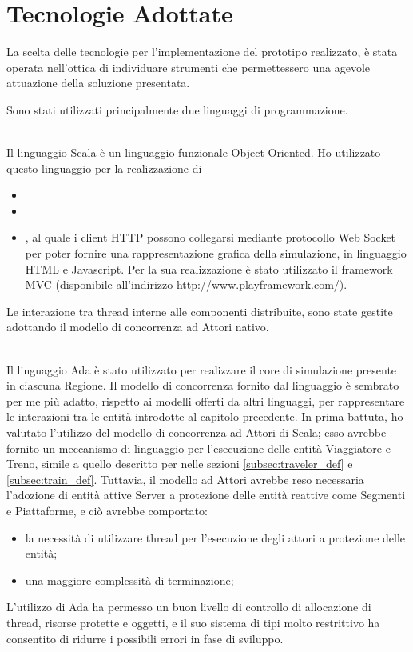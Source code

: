 \chapter{Tecnologie Adottate}

La scelta delle tecnologie per l'implementazione del prototipo realizzato, è stata operata nell'ottica di individuare strumenti che permettessero una agevole attuazione della soluzione presentata.

Sono stati utilizzati principalmente due linguaggi di programmazione.
	\begin{description}
		\item {} \\
		Il linguaggio Scala è un linguaggio funzionale Object Oriented. Ho utilizzato questo linguaggio per la realizzazione di 
			\begin{itemize}
				\item {}
				\item {}
				\item {}, al quale i client HTTP possono collegarsi mediante protocollo Web Socket per poter fornire una rappresentazione grafica della simulazione, in linguaggio HTML e Javascript. Per la sua realizzazione è stato utilizzato il framework MVC  (disponibile all'indirizzo \url{http://www.playframework.com/}).
			\end{itemize}
		Le interazione tra thread interne alle componenti distribuite, sono state gestite adottando il modello di concorrenza ad Attori nativo. 
		\item {} \\
		Il linguaggio Ada è stato utilizzato per realizzare il core di simulazione presente in ciascuna Regione. Il modello di concorrenza fornito dal linguaggio è sembrato per me più adatto, rispetto ai modelli offerti da altri linguaggi, per rappresentare le interazioni tra le entità introdotte al capitolo precedente. 
		In prima battuta, ho valutato l'utilizzo del modello di concorrenza ad Attori di Scala; esso avrebbe fornito un meccanismo di linguaggio per l'esecuzione delle entità Viaggiatore e Treno, simile a quello descritto per nelle sezioni \ref{subsec:traveler_def} e \ref{subsec:train_def}. Tuttavia, il modello ad Attori avrebbe reso necessaria l'adozione di entità attive Server a protezione delle entità reattive come Segmenti e Piattaforme, e ciò avrebbe comportato:
			\begin{itemize}
				\item la necessità di utilizzare thread per l'esecuzione degli attori a protezione delle entità;
				\item una maggiore complessità di terminazione;
			\end{itemize}
		L'utilizzo di Ada ha permesso un buon livello di controllo di allocazione di thread, risorse protette e oggetti, e il suo sistema di tipi molto restrittivo ha consentito di ridurre i possibili errori in fase di sviluppo.
		  
	\end{description}
	
